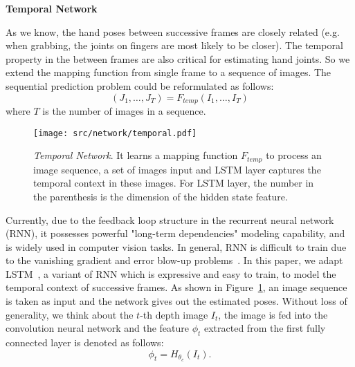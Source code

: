 \documentclass[journal,comsoc]{IEEEtran}
\let\MYoriglatexcaption\caption
\renewcommand{\caption}[2][\relax]{\MYoriglatexcaption[#2]{#2}}
\def \J{\bm{\mathit{J}}}
\def \I{\mathit{I}}
\def \H{\mathit{H}}
\begin{document}
\vspace{1em}
\noindent \textbf{Temporal Network}\vspace{0.5em}\label{sec:temporal netowork}

As we know, the hand poses between successive frames are closely related (e.g. when grabbing, the joints
on fingers are most likely to be closer). The temporal property in the between frames are also critical for
estimating hand joints. So we extend the mapping function from single frame to a sequence of images. The
sequential prediction problem could be reformulated as follows:
\begin{equation}\label{eq:seq2seq}
(\J_1, \dots, \J_{T}) = F_{temp}(\I_1, \dots, \I_{T})
\end{equation}
where $T$ is the number of images in a sequence.

\begin{figure}[htbp]
\centering
    \texttt{[image: src/network/temporal.pdf]}
    \caption{\emph{Temporal Network}. It learns a mapping function $F_{temp}$ to process an image sequence,
    a set of images input and LSTM layer captures the temporal context in these images. For LSTM layer, the number
    in the parenthesis is the dimension of the hidden state feature.}
\label{fig:temporal network}
\end{figure}

Currently, due to the feedback loop structure in the recurrent neural network (RNN), it possesses powerful "long-term dependencies"
modeling capability, and is widely used in computer vision tasks. In general, RNN is difficult to train due to the vanishing
gradient and error blow-up problems~\cite{kawakami2008supervised}. In this paper, we adapt LSTM~\cite{hochreiter1997long,zaremba2014learning},
a variant of RNN which is expressive and easy to train, to model the temporal context of successive frames.
As shown in Figure~\ref{fig:temporal network}, an image sequence is taken as input and the network gives out the estimated poses.
Without loss of generality, we think about the $t$-th depth image $I_t$,
the image is fed into the convolution neural network and the feature $\phi_t$ extracted from the first fully connected layer is denoted as follows:
\begin{equation}
\phi_t=\H_{\theta_c}(I_t).
\end{equation}
\end{document}
